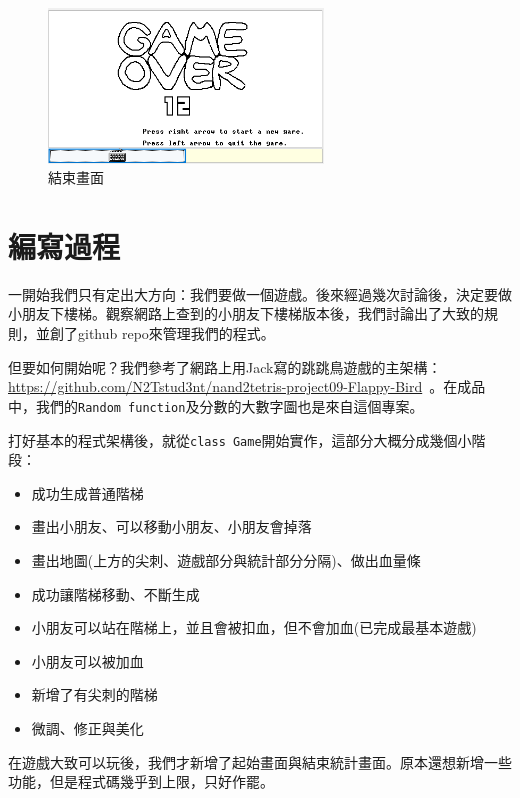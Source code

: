 \documentclass[12pt,a4paper]{article}
\begin{document}
\begin{figure}[H]
\centering
\includegraphics[width=0.65\textwidth]{GameImage_Gameover.png}
\caption{\label{fig:GameImage_Gameover}結束畫面}
\end{figure}

\section{編寫過程}

一開始我們只有定出大方向：我們要做一個遊戲。後來經過幾次討論後，決定要做小朋友下樓梯。觀察網路上查到的小朋友下樓梯版本後，我們討論出了大致的規則，並創了github repo來管理我們的程式。

但要如何開始呢？我們參考了網路上用Jack寫的跳跳鳥遊戲的主架構：\\  \url{https://github.com/N2Tstud3nt/nand2tetris-project09-Flappy-Bird}~。在成品中，我們的\texttt{Random function}及分數的大數字圖也是來自這個專案。

打好基本的程式架構後，就從\texttt{class Game}開始實作，這部分大概分成幾個小階段：

\begin{itemize}
    \setlength{\parsep}{-1em}
    \setlength{\parskip}{0em}
    \setlength{\itemsep}{-4pt}
    \item 成功生成普通階梯
    \item 畫出小朋友、可以移動小朋友、小朋友會掉落
    \item 畫出地圖(上方的尖刺、遊戲部分與統計部分分隔)、做出血量條
    \item 成功讓階梯移動、不斷生成
    \item 小朋友可以站在階梯上，並且會被扣血，但不會加血(已完成最基本遊戲)
    \item 小朋友可以被加血
    \item 新增了有尖刺的階梯
    \item 微調、修正與美化
\end{itemize}

在遊戲大致可以玩後，我們才新增了起始畫面與結束統計畫面。原本還想新增一些功能，但是程式碼幾乎到上限，只好作罷。
\end{document}
